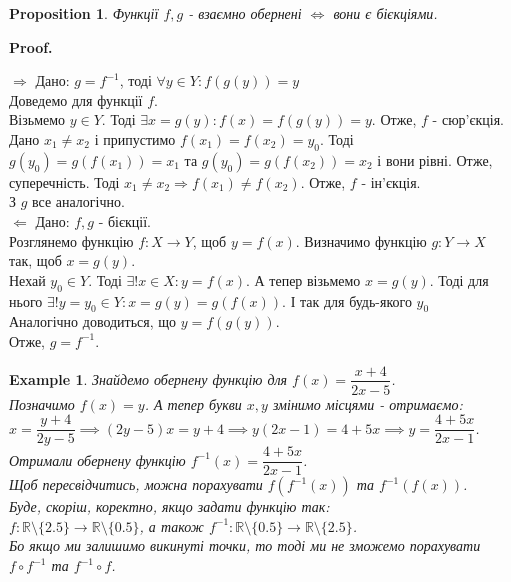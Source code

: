 \documentclass[a4paper, 14pt]{article}
\makeatletter
\def\qed{$\blacksquare$}
\def\rightproof{$\boxed{\Rightarrow}$ }
\theoremstyle{theoremdd}
\theoremstyle{theoremdd}
\theoremstyle{theoremdd}
\theoremstyle{theoremdd}
\newtheorem{example}[theorem]{Example}
\theoremstyle{theoremdd}
\newtheorem{proposition}[theorem]{Proposition}
\theoremstyle{theoremdd}
\theoremstyle{theoremdd}
\theoremstyle{theoremdd}
\renewenvironment{proof}[1][Proof.\\]{\par
\pushQED{\hfill \qed}%
\normalfont \topsep6\p@\@plus6\p@\relax
\trivlist
\item\relax
{\bfseries
#1\@addpunct{.}}\hspace\labelsep\ignorespaces
}{%
\popQED\endtrivlist\@endpefalse
}
\makeatother
\begin{document}
	\begin{proposition}
	Функції $f,g$ - взаємно обернені $\iff$ вони є бієкціями.
	\end{proposition}
	
	\begin{proof}
	\rightproof Дано: $g = f^{-1}$, тоді $\forall y \in Y: f(g(y)) = y$\\
	Доведемо для функції $f$.\\
	Візьмемо $y \in Y$. Тоді $\exists x = g(y): f(x) = f(g(y)) = y$. Отже, $f$ - сюр'єкція.\\
	Дано $x_1 \neq x_2$ і припустимо $f(x_1) = f(x_2) = y_0$. Тоді $g(y_0) = g(f(x_1)) = x_1$ та $g(y_0) = g(f(x_2)) = x_2$ і вони рівні. Отже, суперечність. Тоді $x_1 \neq x_2 \Rightarrow f(x_1) \neq f(x_2)$. Отже, $f$ - ін'єкція.\\
	З $g$ все аналогічно.
	\bigskip \\
	$\boxed{\Leftarrow}$ Дано: $f,g$ - бієкції.\\
	Розглянемо функцію $f: X \to Y$, щоб $y = f(x)$. Визначимо функцію $g: Y \to X$ так, щоб $x = g(y)$.\\
	Нехай $y_0 \in Y$. Тоді $\exists! x \in X: y = f(x)$. А тепер візьмемо $x = g(y)$. Тоді для нього $\exists! y = y_0 \in Y: x = g(y) = g(f(x))$. І так для будь-якого $y_0$\\
	Аналогічно доводиться, що $y = f(g(y))$.\\
	Отже, $g = f^{-1}$.
	\end{proof}
	
	\begin{example} Знайдемо обернену функцію для $f(x) = \dfrac{x+4}{2x-5}$.\\
	Позначимо $f(x) = y$. А тепер букви $x,y$ змінимо місцями - отримаємо:\\
	$x = \dfrac{y+4}{2y-5} \implies (2y-5)x = y+4 \implies y(2x-1) = 4+5x \implies y = \dfrac{4+5x}{2x-1}$.\\
	Отримали обернену функцію $f^{-1}(x) = \dfrac{4+5x}{2x-1}$.\\
	Щоб пересвідчитись, можна порахувати $f(f^{-1}(x))$ та $f^{-1}(f(x))$.
	\bigskip \\
	Буде, скоріш, коректно, якщо задати функцію так: \\ $f: \mathbb{R} \setminus \{2.5\} \to \mathbb{R} \setminus \{0.5\}$, а також $f^{-1}: \mathbb{R} \setminus \{0.5\} \to \mathbb{R} \setminus \{2.5\}$.\\ 
	Бо якщо ми залишимо викинуті точки, то тоді ми не зможемо порахувати $f \circ f^{-1}$ та $f^{-1} \circ f$.
	\end{example}
	
\end{document}
